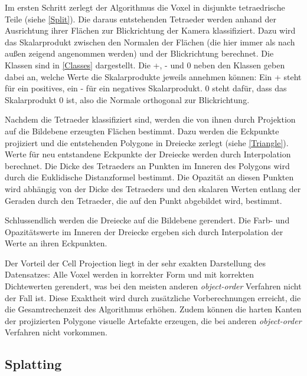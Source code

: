 \documentclass[a4paper,fontsize=12pt,toc=bib,parskip=half,ngerman]{scrartcl}
\begin{document}
Im ersten Schritt zerlegt der Algorithmus die Voxel in disjunkte tetraedrische Teile (siehe \cref{Split}). Die daraus entstehenden Tetraeder werden anhand der Ausrichtung ihrer Fl\"achen zur Blickrichtung der Kamera klassifiziert. Dazu wird das Skalarprodukt zwischen den Normalen der Fl\"achen (die hier immer als nach au{\ss}en zeigend angenommen werden) und der Blickrichtung berechnet. Die Klassen sind in \cref{Classes} dargestellt. Die +, - und 0 neben den Klassen geben dabei an, welche Werte die Skalarprodukte jeweils annehmen k\"onnen: Ein + steht f\"ur ein positives, ein - f\"ur ein negatives Skalarprodukt. 0 steht daf\"ur, dass das Skalarprodukt 0 ist, also die Normale orthogonal zur Blickrichtung.

Nachdem die Tetraeder klassifiziert sind, werden die von ihnen durch Projektion auf die Bildebene erzeugten Fl\"achen bestimmt. Dazu werden die Eckpunkte projiziert und die entstehenden Polygone in Dreiecke zerlegt (siehe \cref{Triangle}). Werte f\"ur neu entstandene Eckpunkte der Dreiecke werden durch Interpolation berechnet. Die Dicke des Tetraeders an Punkten im Inneren des Polygons wird durch die Euklidische Distanzformel bestimmt. Die Opazit\"at an diesen Punkten wird abh\"angig von der Dicke des Tetraeders und den skalaren Werten entlang der Geraden durch den Tetraeder, die auf den Punkt abgebildet wird, bestimmt.

Schlussendlich werden die Dreiecke auf die Bildebene gerendert. Die Farb- und Opazit\"atswerte im Inneren der Dreiecke ergeben sich durch Interpolation der Werte an ihren Eckpunkten. 

Der Vorteil der Cell Projection liegt in der sehr exakten Darstellung des Datensatzes: Alle Voxel werden in korrekter Form und mit korrekten Dichtewerten gerendert, was bei den meisten anderen \textit{object-order} Verfahren nicht der Fall ist. Diese Exaktheit wird durch zus\"atzliche Vorberechnungen erreicht, die die Gesamtrechenzeit des Algorithmus erh\"ohen. Zudem k\"onnen die harten Kanten der projizierten Polygone visuelle Artefakte erzeugen, die bei anderen \textit{object-order} Verfahren nicht vorkommen.

\subsection{Splatting}
\end{document}
